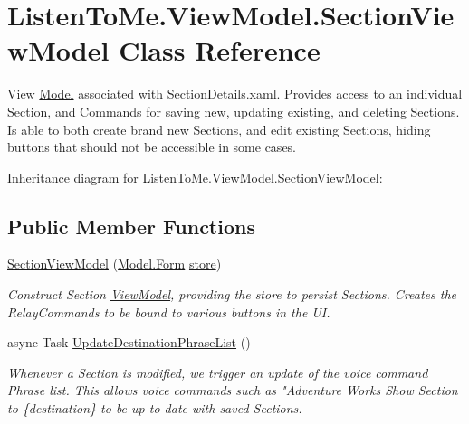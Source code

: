 \hypertarget{class_listen_to_me_1_1_view_model_1_1_section_view_model}{}\section{Listen\+To\+Me.\+View\+Model.\+Section\+View\+Model Class Reference}
\label{class_listen_to_me_1_1_view_model_1_1_section_view_model}


View \mbox{\hyperlink{namespace_listen_to_me_1_1_model}{Model}} associated with Section\+Details.\+xaml. Provides access to an individual Section, and Commands for saving new, updating existing, and deleting Sections. Is able to both create brand new Sections, and edit existing Sections, hiding buttons that should not be accessible in some cases.  




Inheritance diagram for Listen\+To\+Me.\+View\+Model.\+Section\+View\+Model\+:
\subsection*{Public Member Functions}
\begin{DoxyCompactItemize}
\item 
\mbox{\hyperlink{class_listen_to_me_1_1_view_model_1_1_section_view_model_a622922d8160810c017cbe323966da8cd}{Section\+View\+Model}} (\mbox{\hyperlink{class_listen_to_me_1_1_model_1_1_form}{Model.\+Form}} \mbox{\hyperlink{class_listen_to_me_1_1_view_model_1_1_section_view_model_af8a79aa8edbec7bff25750aec728dbef}{store}})
\begin{DoxyCompactList}\small\item\em Construct Section \mbox{\hyperlink{namespace_listen_to_me_1_1_view_model}{View\+Model}}, providing the store to persist Sections. Creates the Relay\+Commands to be bound to various buttons in the UI. \end{DoxyCompactList}\item 
async Task \mbox{\hyperlink{class_listen_to_me_1_1_view_model_1_1_section_view_model_a47ce8676fc601da4752a2ddab8d2250a}{Update\+Destination\+Phrase\+List}} ()
\begin{DoxyCompactList}\small\item\em Whenever a Section is modified, we trigger an update of the voice command Phrase list. This allows voice commands such as "Adventure Works Show Section to \{destination\} to be up to date with saved Sections. \end{DoxyCompactList}\end{DoxyCompactItemize}
